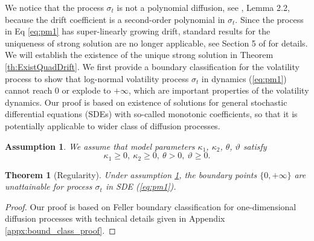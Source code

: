 \documentclass[pdftex,11pt,a4paper] {article}
\newtheorem{theorem}{Theorem}[section]
\newtheorem{assumption}{Assumption}[section]
\begin{document}
We notice that the process $\sigma_t$ is not a polynomial diffusion, see \cite{Filip16}, Lemma 2.2, because the drift coefficient is a second-order polynomial in $\sigma_{t}$. Since the process in Eq \eqref{eq:pm1} has super-linearly growing drift, standard results for the uniqueness of strong solution are no longer applicable, see Section 5 of \cite{KaratzShre} for details. We will establish the existence of the unique strong solution in Theorem \ref{th:ExistQuadDrift}. 
We first provide a boundary classification for the volatility process to show that log-normal volatility process $\sigma_{t}$ in dynamics (\ref{eq:pm1}) cannot reach 0 or explode to $+\infty$, which are important properties of the volatility dynamics. Our proof is based on existence of solutions for general stochastic differential equations (SDEs) with so-called monotonic coefficients, so that it is potentially applicable to wider class of diffusion processes. 


\begin{assumption}\label{as:bound_class}
We assume that model parameters $\kappa_1$, $\kappa_2$, $\theta$, $\vartheta$ satisfy
\begin{equation}\label{eq:condExist}
\kappa_1\ge 0, \ \kappa_2\ge 0, \ \theta>0, \ \vartheta\ge 0.
\end{equation}
\end{assumption}
 
\begin{theorem}[Regularity]\label{th:bound_class}
Under assumption \ref{as:bound_class}, the boundary points $\{0, +\infty\}$ are unattainable for process $\sigma_{t}$ in SDE (\ref{eq:pm1}). 
\end{theorem}
\begin{proof}
Our proof is based on Feller boundary classification for one-dimensional diffusion processes with technical details given in Appendix \ref{appx:bound_class_proof}.
\end{proof}
\end{document}
